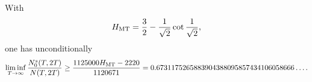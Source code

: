 \begin{theorem}\label{thm:main}
With
\[
 H_{\rm MT}
 =
 \frac32-\frac1{\sqrt2}\cot\frac1{\sqrt2},
\]
one has unconditionally
\[
 \liminf_{T\to\infty}
 \frac{N_0^s(T,2T)}{N(T,2T)}
 \ge
 \frac{1125000H_{\rm MT}-2220}{1120671}
 =
 0.6731175265883904388095857434106058666\ldots .
\]
\end{theorem}
